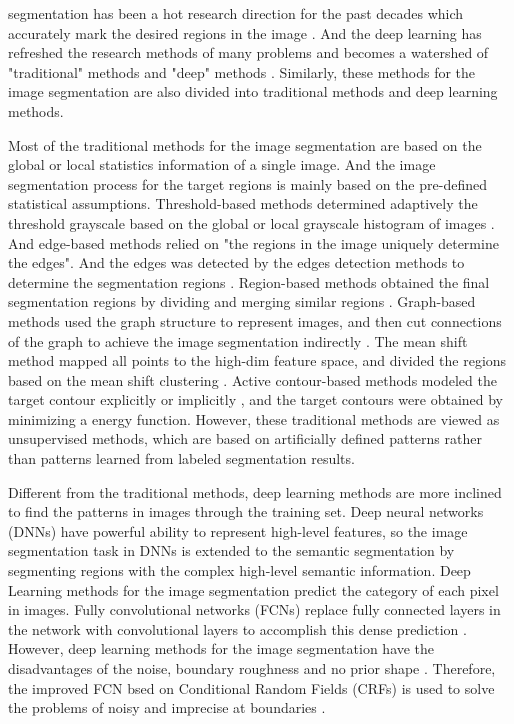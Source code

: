  segmentation has been a hot research direction for the past decades which accurately mark the desired regions in the image \cite{Introduction:pal1993review}. And the deep learning has refreshed the research methods of many problems and becomes a watershed of "traditional" methods and "deep" methods \cite{Introduction:lecun2015deep}. Similarly, these methods for the image segmentation are also divided into traditional methods and deep learning methods.

Most of the traditional methods for the image segmentation are based on the global or local statistics information of a single image. And the image segmentation process for the target regions is mainly based on the pre-defined statistical assumptions. Threshold-based methods determined adaptively the threshold grayscale based on the global or local grayscale histogram of images \cite{Introduction:traditional:threshold:sezgin2004survey}. And edge-based methods relied on "the regions in the image uniquely determine the edges". And the edges was detected by the edges detection methods to determine the segmentation regions \cite{Introduction:traditional:edge:senthilkumaran2009edge}. Region-based methods obtained the final segmentation regions by dividing and merging similar regions \cite{Introduction:traditional:watershed:nguyen2003watersnakes, LevelSet:superpixels:achanta2012slic}. Graph-based methods used the graph structure to represent images, and then cut connections of the graph to achieve the image segmentation indirectly \cite{Introduction:traditional:graph:felzenszwalb2004efficient}. The mean shift method mapped all points to the high-dim feature space, and divided the regions based on the mean shift clustering \cite{Introduction:traditional:meanShift:comaniciu2002mean}. Active contour-based methods modeled the target contour explicitly \cite{Introduction:traditional:snakes:kass1988snakes} or implicitly \cite{LevelSet:chan2001active}, and the target contours were obtained by minimizing a energy function. However, these traditional methods are viewed as unsupervised methods, which are based on artificially defined patterns rather than patterns learned from labeled segmentation results.

Different from the traditional methods, deep learning methods are more inclined to find the patterns in images through the training set. Deep neural networks (DNNs) have powerful ability to represent high-level features, so the image segmentation task in DNNs is extended to the semantic segmentation by segmenting regions with the complex high-level semantic information. Deep Learning methods for the image segmentation predict the category of each pixel in images. Fully convolutional networks (FCNs) replace fully connected layers in the network with convolutional layers to accomplish this dense prediction \cite{FCN-original:long2015fully}. However, deep learning methods for the image segmentation have the disadvantages of the noise, boundary roughness and no prior shape \cite{Introduction:FCN:ronneberger2015u, Introduction:FCN:badrinarayanan2017segnet}. Therefore, the improved FCN bsed on Conditional Random Fields (CRFs) is used to solve the problems of noisy and imprecise at boundaries \cite{Introduction:FCN:chen2018deeplab, FCN:CRF:zheng2015conditional}.


